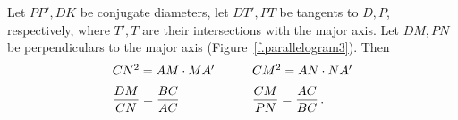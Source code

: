 
\begin{theorem}\label{thm.cmpnacbc}
Let $PP',DK$ be conjugate diameters, let $DT',PT$ be tangents to $D,P$, respectively, where $T',T$ are their intersections with the major axis. Let $DM, PN$ be perpendiculars to the major axis (Figure~\ref{f.parallelogram3}). Then
\[
\begin{array}{l@{\hspace{3em}}l}
CN^2=AM\cdot MA'& CM^2=AN\cdot NA'\\[6pt]
\displaystyle\frac{DM}{CN}=\frac{BC}{AC}& \displaystyle\frac{CM}{PN}=\frac{AC}{BC}\,.
\end{array}
\]
\end{theorem}


